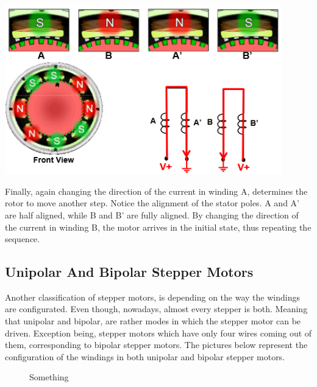 \begin{center}
	\includegraphics[width=0.9\textwidth]{figures/move/motor35}
\end{center}


Finally, again changing the direction of the current in winding A, determines the rotor to move another step. Notice the alignment of the stator poles. A and A’ are half aligned, while B and B’ are fully aligned. By changing the direction of the current in winding B, the motor arrives in the initial state, thus repeating the sequence.

\subsection{Unipolar And Bipolar Stepper Motors}

Another classification of stepper motors, is depending on the way the windings are configurated. Even though, nowadays, almost every stepper is both. Meaning that unipolar and bipolar, are rather modes in which the stepper motor can be driven. Exception being, stepper motors which have only four wires coming out of them, corresponding to bipolar stepper motors.
\newpage
The pictures below represent the configuration of the windings in both unipolar and bipolar stepper motors. 


\begin{figure}[htp] 
    \centering
    \hfill
    \caption{Something}
\end{figure}

